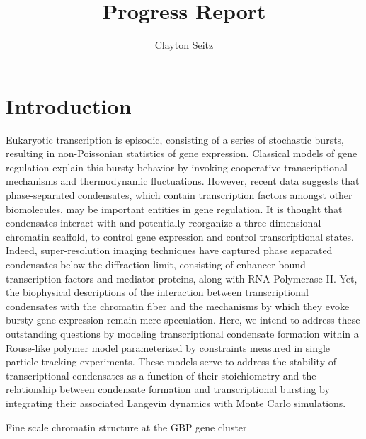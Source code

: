 \documentclass{article}
\begin{document}
\title{Progress Report}
\author{Clayton Seitz}
\maketitle
\thispagestyle{empty}


\section{Introduction}

Eukaryotic transcription is episodic, consisting of a series of stochastic bursts, resulting in non-Poissonian statistics of gene expression. Classical models of gene regulation explain this bursty behavior by invoking cooperative transcriptional mechanisms and thermodynamic fluctuations. However, recent data suggests that phase-separated condensates, which contain transcription factors amongst other biomolecules, may be important entities in gene regulation. It is thought that condensates interact with and potentially reorganize a three-dimensional chromatin scaffold, to control gene expression and control transcriptional states. Indeed, super-resolution imaging techniques have captured phase separated condensates below the diffraction limit, consisting of enhancer-bound transcription factors and mediator proteins, along with RNA Polymerase II. Yet, the biophysical descriptions of the interaction between transcriptional condensates with the chromatin fiber and the mechanisms by which they evoke bursty gene expression remain mere speculation. Here, we intend to address these outstanding questions by modeling transcriptional condensate formation within a Rouse-like polymer model parameterized by constraints measured in single particle tracking experiments. These models serve to address the stability of transcriptional condensates as a function of their stoichiometry and the relationship between condensate formation and transcriptional bursting by integrating their associated Langevin dynamics with Monte Carlo simulations. 

Fine scale chromatin structure at the GBP gene cluster 
\end{document}
